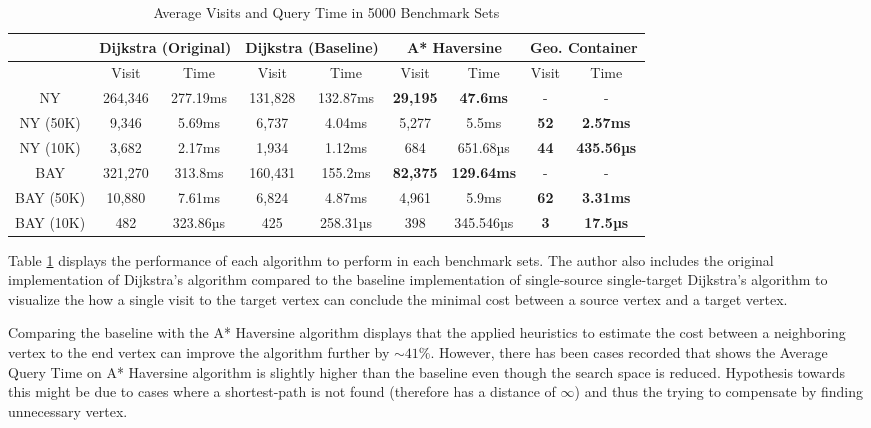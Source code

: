 \documentclass{article}
\begin{document}
\begin{table}
    \centering
    \begin{tabular}{ccccccccc}
 & \multicolumn{2}{c}{Dijkstra (Original)}& \multicolumn{2}{c}{Dijkstra (Baseline)}& \multicolumn{2}{c}{A* Haversine}& \multicolumn{2}{c}{Geo. Container}\\
 \hline
         &  Visit&  Time&  Visit&  Time&  Visit&  Time&  Visit& Time\\
         \hline
         NY&  264,346&  277.19ms&  131,828&  132.87ms&  \textbf{29,195}&  \textbf{47.6ms} &  -& -\\
         NY (50K)&  9,346&  5.69ms&  6,737 &  4.04ms&  5,277&  5.5ms&  \textbf{52}& \textbf{2.57ms}\\
         NY (10K)&  3,682&  2.17ms&  1,934&  1.12ms&  684&  651.68µs&  \textbf{44}& \textbf{435.56µs}\\
         \hline
         BAY&  321,270&  313.8ms&  160,431&  155.2ms&  \textbf{82,375}&  \textbf{129.64ms}&  -& -\\
         BAY (50K)&  10,880&  7.61ms&  6,824&  4.87ms&  4,961&  5.9ms&  \textbf{62}& \textbf{3.31ms}\\
         BAY (10K)&  482&  323.86µs&  425&  258.31µs&  398&  345.546µs&  \textbf{3}& \textbf{17.5µs}\\
         \hline
    \end{tabular}
    \caption{Average Visits and Query Time in 5000 Benchmark Sets}
    \label{tab:avgvq}
\end{table}

Table \ref{tab:avgvq} displays the performance of each algorithm to perform in each benchmark sets. The author also includes the original implementation of Dijkstra's algorithm compared to the baseline implementation of single-source single-target Dijkstra's algorithm to visualize the how a single visit to the target vertex can conclude the minimal cost between a source vertex and a target vertex.

Comparing the baseline with the A* Haversine algorithm displays that the applied heuristics to estimate the cost between a neighboring vertex to the end vertex can improve the algorithm further by $\sim41\%$. However, there has been cases recorded that shows the Average Query Time on A* Haversine algorithm is slightly higher than the baseline even though the search space is reduced. Hypothesis towards this might be due to cases where a shortest-path is not found (therefore has a distance of $\infty$) and thus the trying to compensate by finding unnecessary vertex.
\end{document}
